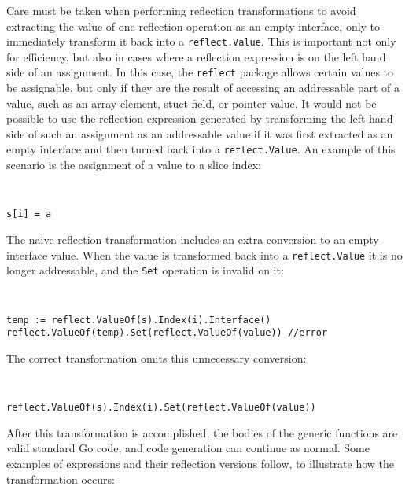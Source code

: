\documentclass[letterpaper,11pt]{article}
\begin{document}
Care must be taken when performing reflection transformations to avoid extracting the value of one reflection operation as an empty interface, only to immediately transform it back into a \texttt{reflect.Value}. This is important not only for efficiency, but also in cases where a reflection expression is on the left hand side of an assignment. In this case, the \texttt{reflect} package allows certain values to be assignable, but only if they are the result of accessing an addressable part of a value, such as an array element, stuct field, or pointer value. It would not be possible to use the reflection expression generated by transforming the left hand side of such an assignment as an addressable value if it was first extracted as an empty interface and then turned back into a \texttt{reflect.Value}. An example of this scenario is the assignment of a value to a slice index:
{ \tt \small
\begin{verbatim}
s[i] = a
\end{verbatim}
}
The naive reflection transformation includes an extra conversion to an empty interface value. When the value is transformed back into a \texttt{reflect.Value} it is no longer addressable, and the \texttt{Set} operation is invalid on it:
{ \tt \small
\begin{verbatim}
temp := reflect.ValueOf(s).Index(i).Interface()
reflect.ValueOf(temp).Set(reflect.ValueOf(value)) //error
\end{verbatim}
}
The correct transformation omits this unnecessary conversion:
{ \tt \small
\begin{verbatim}
reflect.ValueOf(s).Index(i).Set(reflect.ValueOf(value))
\end{verbatim}
}

After this transformation is accomplished, the bodies of the generic functions are valid standard Go code, and code generation can continue as normal. Some examples of expressions and their reflection versions follow, to illustrate how the transformation occurs:
\end{document}
